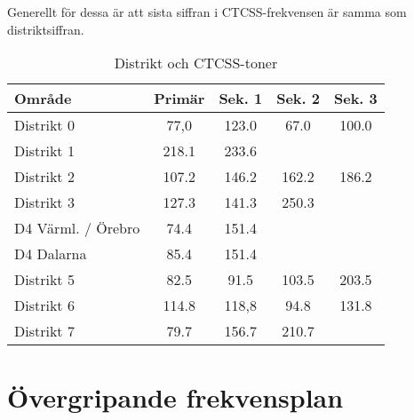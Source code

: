 Generellt för dessa är att sista siffran i CTCSS-frekvensen är samma som
distriktsiffran.

\begin{table}[H]
\centering
\begin{tabular}{lcccc}
	\textbf{Område}    & \textbf{Primär} & \textbf{Sek. 1} & \textbf{Sek. 2} & \textbf{Sek. 3} \\ \hline
	Distrikt 0         & 77,0            & 123.0           & 67.0            & 100.0           \\
	Distrikt 1         & 218.1           & 233.6           &                 &                 \\
	Distrikt 2         & 107.2           & 146.2           & 162.2           & 186.2           \\
	Distrikt 3         & 127.3           & 141.3           & 250.3           &                 \\
	D4 Värml. / Örebro & 74.4            & 151.4           &                 &                 \\
	D4 Dalarna         & 85.4            & 151.4           &                 &                 \\
	Distrikt 5         & 82.5            & 91.5            & 103.5           & 203.5           \\
	Distrikt 6         & 114.8           & 118,8           & 94.8            & 131.8           \\
	Distrikt 7         & 79.7            & 156.7           & 210.7           &
\end{tabular}
\caption{Distrikt och CTCSS-toner}
\end{table}

\section{Övergripande frekvensplan}

